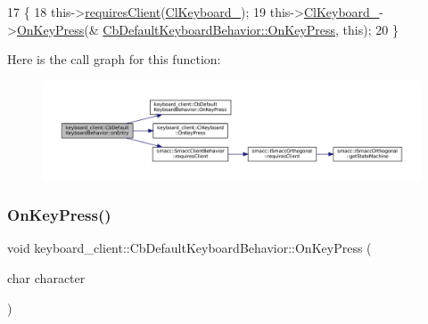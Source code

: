 \begin{DoxyCode}
17     \{
18         this->\hyperlink{classsmacc_1_1SmaccClientBehavior_a917f001e763a1059af337bf4e164f542}{requiresClient}(\hyperlink{classkeyboard__client_1_1CbDefaultKeyboardBehavior_a17c088cabe2d686f227d2a6368629993}{ClKeyboard\_});
19         this->\hyperlink{classkeyboard__client_1_1CbDefaultKeyboardBehavior_a17c088cabe2d686f227d2a6368629993}{ClKeyboard\_}->\hyperlink{classkeyboard__client_1_1ClKeyboard_a09581faae1ada2cdd53010ebb9a2197a}{OnKeyPress}(&
      \hyperlink{classkeyboard__client_1_1CbDefaultKeyboardBehavior_ae6b6fa6b648a503f2a55eccde8556daa}{CbDefaultKeyboardBehavior::OnKeyPress}, \textcolor{keyword}{this});
20     \}
\end{DoxyCode}
Here is the call graph for this function\+:
\nopagebreak
\begin{figure}[H]
\begin{center}
\leavevmode
\includegraphics[width=350pt]{classkeyboard__client_1_1CbDefaultKeyboardBehavior_a1ac673a9d9a733215f665810d6cf69aa_cgraph}
\end{center}
\end{figure}
\mbox{\label{classkeyboard__client_1_1CbDefaultKeyboardBehavior_ae6b6fa6b648a503f2a55eccde8556daa}} 
\subsubsection{\texorpdfstring{On\+Key\+Press()}{OnKeyPress()}}
{\footnotesize\ttfamily void keyboard\+\_\+client\+::\+Cb\+Default\+Keyboard\+Behavior\+::\+On\+Key\+Press (\begin{DoxyParamCaption}\item[{char}]{character }\end{DoxyParamCaption})\hspace{0.3cm}{\ttfamily [inline]}}



